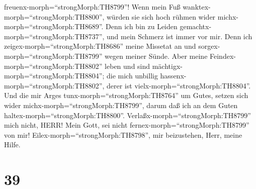 freuenx-morph=``strongMorph:TH8799''! Wenn mein Fuß
wanktex-morph=``strongMorph:TH8800'', würden sie sich hoch rühmen wider
michx-morph=``strongMorph:TH8689''.  Denn ich bin zu Leiden
gemachtx-morph=``strongMorph:TH8737'', und mein Schmerz ist immer vor
mir.  Denn ich zeigex-morph=``strongMorph:TH8686'' meine
Missetat an und sorgex-morph=``strongMorph:TH8799'' wegen meiner Sünde.
 Aber meine Feindex-morph=``strongMorph:TH8802'' leben und
sind mächtigx-morph=``strongMorph:TH8804''; die mich unbillig
hassenx-morph=``strongMorph:TH8802'', derer ist
vielx-morph=``strongMorph:TH8804''.  Und die mir Arges
tunx-morph=``strongMorph:TH8764'' um Gutes, setzen sich wider
michx-morph=``strongMorph:TH8799'', darum daß ich an dem Guten
haltex-morph=``strongMorph:TH8800''. 
Verlaßx-morph=``strongMorph:TH8799'' mich nicht, HERR! Mein Gott, sei
nicht fernex-morph=``strongMorph:TH8799'' von mir! 
Eilex-morph=``strongMorph:TH8798'', mir beizustehen, Herr, meine Hilfe.

\hypertarget{section-38}{%
\section{39}\label{section-38}}

